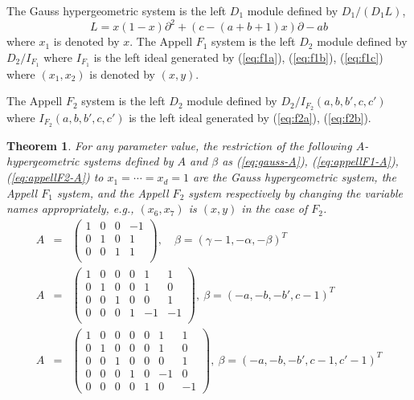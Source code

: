 \documentclass{article}
\def\aa{a}
\def\bb{b}
\def\cc{c}
\def\p{\partial}
\newtheorem{theorem}{Theorem}
\begin{document}
The Gauss hypergeometric system 
is the left $D_1$ module defined by $D_1/(D_1 L)$,
\begin{equation}
L= x(1-x)\p^2 + (\cc - (\aa + \bb + 1)x)\p - \aa \bb
\end{equation}
where $x_1$ is denoted by $x$.
The Appell $F_1$ system is the left $D_2$  module defined by 
$D_2/I_{F_1}$
where $I_{F_1}$ is the left ideal generated by 
(\ref{eq:f1a}), (\ref{eq:f1b}), (\ref{eq:f1c}) 
where $(x_1,x_2)$ is denoted by $(x,y)$.

The Appell $F_2$ system is the left $D_2$ module defined by
$D_2/I_{F_2}(\aa,\bb,\bb',\cc,\cc')$
where $I_{F_2}(\aa,\bb,\bb',\cc,\cc')$ is the left ideal generated by
(\ref{eq:f2a}), (\ref{eq:f2b}).

\begin{theorem} \label{th:restriction_to_gauss_F1_F2}
For any parameter value,
the restriction of the following $A$-hypergeometric systems
defined by $A$ and $\beta$ as
(\ref{eq:gauss-A}), (\ref{eq:appellF1-A}), (\ref{eq:appellF2-A})
to $x_1= \cdots = x_d=1$ are the Gauss hypergeometric system,
the Appell $F_1$ system, and the Appell $F_2$ system respectively
by changing the variable names appropriately, e.g.,
$(x_6,x_7)$ is $(x,y)$ in the case of $F_2$.
\begin{eqnarray}
 A&=&\left(\begin{array}{cccc}
 1 & 0 & 0 &-1 \\
 0 & 1 & 0 & 1 \\
 0 & 0 & 1 & 1 \\
\end{array} \right), \quad
 \beta=(\gamma-1,-\alpha,-\beta)^T  \label{eq:gauss-A} \\
A&=&\left(\begin{array}{cccccc}
1& 0& 0& 0& 1& 1\\
0& 1& 0& 0& 1& 0\\
0& 0& 1& 0& 0& 1\\
0& 0& 0& 1& -1& -1\\
\end{array}\right), \ 
\beta=(-\aa,-\bb,-\bb',\cc-1)^T \label{eq:appellF1-A} \\
A&=&\left(\begin{array}{ccccccc}
1& 0& 0& 0& 0& 1& 1\\
0& 1& 0& 0& 0& 1& 0\\
0& 0& 1& 0& 0& 0& 1\\
0& 0& 0& 1& 0& -1& 0\\
0& 0& 0& 0& 1& 0& -1
\end{array}\right), \ 
\beta=(-\aa,-\bb,-\bb',\cc-1,\cc'-1)^T \label{eq:appellF2-A}
\end{eqnarray}
\end{theorem}
\end{document}
